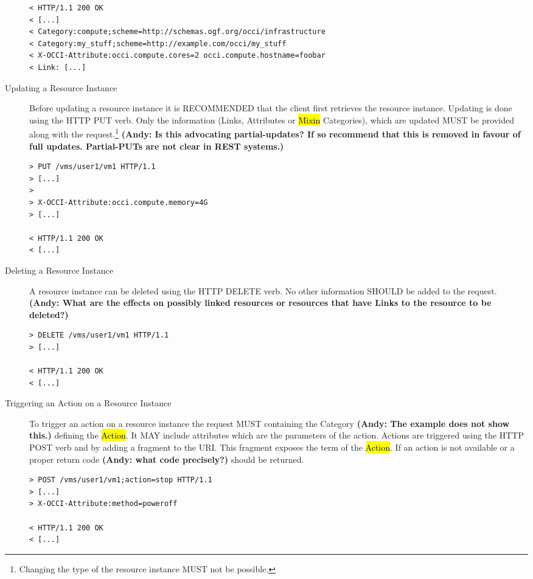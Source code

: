 \documentclass[10pt,a4paper]{article}
\begin{document}
\begin{description}
\begin{verbatim}
< HTTP/1.1 200 OK
< [...]
< Category:compute;scheme=http://schemas.ogf.org/occi/infrastructure
< Category:my_stuff;scheme=http://example.com/occi/my_stuff
< X-OCCI-Attribute:occi.compute.cores=2 occi.compute.hostname=foobar
< Link: [...]
\end{verbatim}

\item[Updating a Resource Instance] Before updating a resource
  instance it is RECOMMENDED that the client first retrieves the
  resource instance. Updating is done using the HTTP PUT verb. Only
  the information (Links, Attributes or \hl{Mixin} Categories), which
  are updated MUST be provided along with the
  request.\footnote{Changing the type of the resource instance MUST
    not be possible.} \textbf{(Andy: Is this advocating partial-updates? If so recommend 
    that this is removed in favour of full updates. Partial-PUTs are not clear in REST systems.)}
\begin{verbatim}
> PUT /vms/user1/vm1 HTTP/1.1
> [...]
> 
> X-OCCI-Attribute:occi.compute.memory=4G
> [...]
 
< HTTP/1.1 200 OK
< [...]
\end{verbatim}

\item[Deleting a Resource Instance] A resource instance can be deleted
  using the HTTP DELETE verb. No other information SHOULD be added to
  the request. \textbf{(Andy: What are the effects on possibly linked resources 
  or resources that have Links to the resource to be deleted?)}
\begin{verbatim}
> DELETE /vms/user1/vm1 HTTP/1.1
> [...]

< HTTP/1.1 200 OK
< [...]
\end{verbatim}

\item[Triggering an Action on a Resource Instance] To trigger an
  action on a resource instance the request MUST containing the Category 
  \textbf{(Andy: The example does not show this.)}
  defining the \hl{Action}. It MAY include attributes which are the
  parameters of the action. Actions are triggered using the HTTP POST
  verb and by adding a fragment to the URI. This fragment exposes the
  term of the \hl{Action}. If an action is not available or a proper 
  return code \textbf{(Andy: what code precisely?)} should be returned.
\begin{verbatim}
> POST /vms/user1/vm1;action=stop HTTP/1.1
> [...]
> X-OCCI-Attribute:method=poweroff

< HTTP/1.1 200 OK
< [...]
\end{verbatim}
\end{description}
\end{document}
